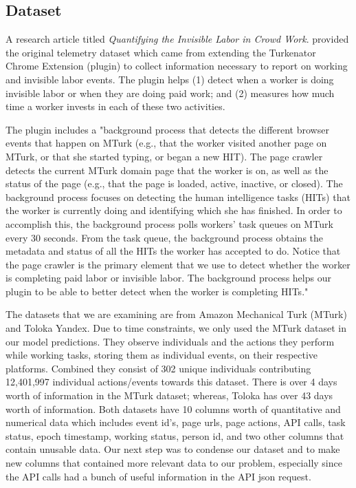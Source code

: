 \documentclass[11pt]{article}
\begin{document}
\begin{multicols}{2}
\subsection{Dataset}
A research article titled \textit{Quantifying the Invisible Labor in Crowd Work}. \cite{toxtli2021} provided the original telemetry dataset which came from extending the Turkenator Chrome Extension (plugin) to collect information necessary to report on working and  invisible labor events. \cite{toloka-web-extension-github} The plugin helps (1) detect when a worker is doing invisible labor or when they are doing paid work; and (2) measures how much time a worker invests in each of these two activities. \cite[p.~4]{toxtli2021}

The plugin includes a "background process that detects the different browser events that happen on MTurk (e.g., that the worker visited another page on MTurk, or that she started typing, or began a new HIT). The page crawler detects the current MTurk domain page that the worker is on, as well as the status of the page (e.g., that the page is loaded, active, inactive, or closed). The background process focuses on detecting the human intelligence tasks (HITs) that the worker is currently doing and identifying which she has finished. In order to accomplish this, the background process polls workers’ task queues on MTurk every 30 seconds. From the task queue, the background process obtains the metadata and status of all the HITs the worker has accepted to do. Notice that the page crawler is the primary element that we use to detect whether the worker is completing paid labor or invisible labor. The background process helps our plugin to be able to better detect when the worker is completing HITs." \cite[p.~5]{toxtli2021}

The datasets that we are examining are from Amazon Mechanical Turk (MTurk) and Toloka Yandex. Due to time constraints, we only used the MTurk dataset in our model predictions. They observe individuals and the actions they perform while working tasks, storing them as individual events, on their respective platforms. Combined they consist of 302 unique individuals contributing 12,401,997 individual actions/events towards this dataset. There is over 4 days worth of information in the MTurk dataset; whereas, Toloka has over 43 days worth of information. Both datasets have 10 columns worth of quantitative and numerical data which includes event id’s, page urls, page actions, API calls, task status, epoch timestamp, working status, person id, and two other columns that contain unusable data. Our next step was to condense our dataset and to make new columns that contained more relevant data to our problem, especially since the API calls had a bunch of useful information in the API json request. 

\end{multicols}
\end{document}
